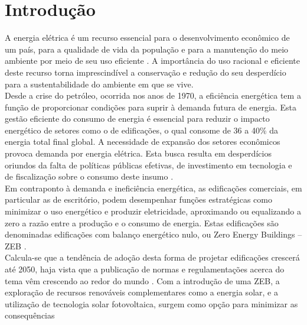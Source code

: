 \section{Introdução}
\linespread{2.5}
     A energia elétrica é um recurso essencial para o desenvolvimento econômico de um país, 
     para a qualidade  de  vida  da  população  e para  a  manutenção  do meio  ambiente
     por  meio  de  seu  uso eficiente \cite{Fonseca2016}. A importância do uso racional
     e eficiente deste recurso torna imprescindível a conservação e redução do seu 
     desperdício para a sustentabilidade do ambiente em que se vive.\\ Desde  a  crise  do  
     petróleo,  ocorrida nos  anos  de 1970,  a eficiência  energética tem  a  função  de 
     proporcionar  condições  para  suprir  à  demanda  futura  de  energia.  Esta  gestão  
     eficiente  do consumo  de  energia  é  essencial  para  reduzir  o  impacto  energético  
     de  setores  como  o  de edificações, o qual consome de 36 a 40\% da energia total final
     global. A necessidade de expansão dos   setores   econômicos   provoca   demanda   por
     energia   elétrica.   Esta   busca   resulta   em desperdícios oriundos da falta de 
     políticas públicas efetivas, de investimento em tecnologia e de fiscalização   sobre 
     o   consumo   deste   insumo \cite{InternationalEnergyAgency-IEA2019,InternationalEnergyAgency-IEA2019a,UnitedNationsEnvironmentProgramme-UNEP2019,UnitedNations2017}.\\
     Em contraponto à demanda e ineficiência energética, as edificações comerciais, em particular 
     as de  escritório,  podem  desempenhar  funções  estratégicas  como  minimizar  o  uso  
     energético  e produzir eletricidade, aproximando ou equalizando a zero a razão entre a 
     produção e o consumo de energia. Estas edificações são denominadas edificações com balanço 
     energético nulo, ou Zero Energy Buildings  –  ZEB \cite{Crawley2009,Torcellini2006,Kurnitski2011,Kurnitski2015,Torcellini2015}.\\
     Calcula-se  que  a  tendência  de  adoção  desta  forma  de  projetar edificações crescerá 
     até 2050, haja vista que a publicação de normas e regulamentações acerca do tema vêm 
     crescendo ao redor do mundo \cite{UnitedNationsEnvironmentProgramme-UNEP2019}. Com  a  introdução  de  uma  ZEB,  a  
     exploração  de  recursos  renováveis  complementares  como  a energia solar, e a utilização 
     de tecnologia solar fotovoltaica, surgem como opção para minimizar as    consequências    
